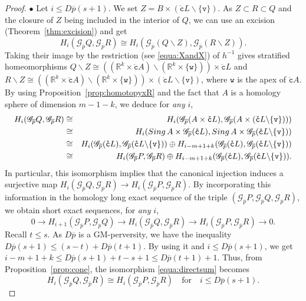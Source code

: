 \documentclass[a4paper,10pt,english,reqno]{amsart}
\theoremstyle{plain}
\theoremstyle{definition}
\theoremstyle{remark}
\numberwithin{equation}{section}
\newcommand{\thmref}[1]{Theorem~\ref{#1}}
\newcommand{\propref}[1]{Proposition~\ref{#1}}
\def\R{{\mathbb R}}
\def\ov{\overline}
\def\crG{{\mathscr G}}
\def\tc{{\mathtt c}}
\def\tv{{\mathtt v}}
\def\tw{{\mathtt w}}
\def\R{\mathbb{R}}
\def\sing{{\rm Sing}}
\def\rc{{\mathring{\tc}}}
\def\menos{\backslash}
\renewcommand\1{\hbox{\ding{192}}}
\renewcommand\2{\hbox{\ding{193}}}
\newcommand\3{\hbox{\ding{194}}}
\newcommand\4{\hbox{\ding{195}}}
\begin{document}
\begin{proof}
\smallskip\noindent
$\bullet$  Let $i\leq D\ov{p}(s+1)$. 
We set $Z=B\times (\rc L\menos\{\tv\})$.
%
As $Z\subset R\subset Q$ and the closure of $Z$ being included in the interior  of $Q$, we can use an excision (\thmref{thm:excision})
and get
$$H_{i}(\crG_{\ov{p}}Q,\crG_{\ov{p}}R)\cong H_{i}(\crG_{\ov{p}}(Q\menos Z),\crG_{\ov{p}}(R\menos Z)).$$
%
Taking their image by the restriction (see \eqref{equa:XandX}) of $h^{-1}$  gives stratified homeomorphisms
$Q\menos Z\cong ((\R^k\times \rc A)\menos (\R^k\times \{\tw\}))\times \rc L$
and
$R\menos Z\cong ((\R^k\times \rc A)\menos (\R^k\times \{\tw\}))\times (\rc L\menos\{\tv\})$,
where $\tw$ is the apex of $\rc A$.
By using \propref{prop:homotopyxR} and the fact that $A$ is a homology sphere of dimension $m-1-k$, we deduce
for \emph{any} $i$,
\begin{eqnarray}
H_{i}(\crG_{\ov{p}}Q,\crG_{\ov{p}}R)
&\cong &
H_{i}(\crG_{\ov{p}}(A\times \rc L),\crG_{\ov{p}}(A\times (\rc L\menos \{\tv\})))\nonumber \\
%
&\cong&
H_{i}(\sing\, A\times \crG_{\ov{p}}(\rc L),\sing \,A\times \crG_{\ov{p}}(\rc L\menos \{\tv\}))\nonumber \\
%
&\cong&
H_{i}(\crG_{\ov{p}}(\rc L),\crG_{\ov{p}}(\rc L\menos \{\tv\}))\oplus
H_{i-m+1+k} (\crG_{\ov{p}}(\rc L),\crG_{\ov{p}}(\rc L\menos \{\tv\}))\nonumber\\
%
&\cong&
H_{i}(\crG_{\ov{p}}P,\crG_{\ov{p}}R)\oplus
H_{i-m+1+k} (\crG_{\ov{p}}(\rc L),\crG_{\ov{p}}(\rc L\menos \{\tv\})).\label{equa:directsum}
\end{eqnarray}
In particular, this isomorphism implies that the canonical injection induces a surjective map
$H_{i}(\crG_{\ov{p}}Q,\crG_{\ov{p}}R) \to H_{i}(\crG_{\ov{p}}P,\crG_{\ov{p}}R)$. 
By incorporating this information in the homology long exact sequence of the triple $(\crG_{\ov{p}}P,\crG_{\ov{p}}Q,\crG_{\ov{p}}R)$,
we obtain short exact sequences, for \emph{any} $i$,
\begin{equation}\label{equa:shortandtop}
0
\to
H_{i+1}(\crG_{\ov{p}}P, \crG_{\ov{p}}Q)
\to
H_{i}(\crG_{\ov{p}}Q,\crG_{\ov{p}}R)
\to
H_{i}(\crG_{\ov{p}}P,\crG_{\ov{p}}R)
\to
0.
\end{equation}
Recall $t\leq s$.
As $D\ov{p}$ is a GM-perversity, we have the inequality $D\ov{p}(s+1)
\leq (s-t)+D\ov{p}(t+1)$.
By using it and $i\leq D\ov{p}(s+1)$, we get
$i-m+1+k\leq D\ov{p}(s+1)+t-s+1\leq D\ov{p}(t+1) +1$.
Thus, from \propref{prop:cone}, the isomorphism \eqref{equa:directsum} becomes
$$H_{i}(\crG_{\ov{p}}Q,\crG_{\ov{p}}R)
\cong
 H_{i}(\crG_{\ov{p}}P,\crG_{\ov{p}}R)\quad \text{for} \quad  i\leq D\ov{p}(s+1).$$

\end{proof}
\end{document}
